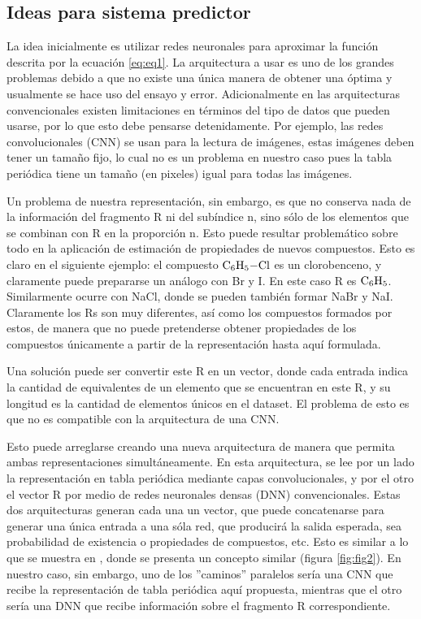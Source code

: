 \documentclass[twoside,twocolumn]{article}
\begin{document}
\subsection{Ideas para sistema predictor}
La idea inicialmente es utilizar redes neuronales para aproximar la funci\'on descrita por la ecuaci\'on \ref{eq:eq1}. La arquitectura a usar es uno de los grandes problemas debido a que no existe una \'unica manera de obtener una \'optima y usualmente se hace uso del ensayo y error. Adicionalmente en las arquitecturas convencionales existen limitaciones en t\'erminos del tipo de datos que pueden usarse, por lo que esto debe pensarse detenidamente. Por ejemplo, las redes convolucionales (CNN) se usan para la lectura de im\'agenes, estas im\'agenes deben tener un tama\~no fijo, lo cual no es un problema en nuestro caso pues la tabla peri\'odica tiene un tama\~no (en pixeles) igual para todas las im\'agenes.

Un problema de nuestra representaci\'on, sin embargo, es que no conserva nada de la informaci\'on del fragmento R ni del sub\'indice n, sino s\'olo de los elementos que se combinan con R en la proporci\'on n. Esto puede resultar problem\'atico sobre todo en la aplicaci\'on de estimaci\'on de propiedades de nuevos compuestos. Esto es claro en el siguiente ejemplo: el compuesto $\ce{C6H5-Cl}$ es un clorobenceno, y claramente puede prepararse un an\'alogo con Br y I. En este caso R es $\ce{C6H5}$. Similarmente ocurre con NaCl, donde se pueden tambi\'en formar NaBr y NaI. Claramente los Rs son muy diferentes, as\'i como los compuestos formados por estos, de manera que no puede pretenderse obtener propiedades de los compuestos \'unicamente a partir de la representaci\'on hasta aqu\'i formulada.

Una soluci\'on puede ser convertir este R en un vector, donde cada entrada indica la cantidad de equivalentes de un elemento que se encuentran en este R, y su longitud es la cantidad de elementos \'unicos en el dataset. El problema de esto es que no es compatible con la arquitectura de una CNN.

Esto puede arreglarse creando una nueva arquitectura de manera que permita ambas representaciones simult\'aneamente. En esta arquitectura, se lee por un lado la representaci\'on en tabla peri\'odica mediante capas convolucionales, y por el otro el vector R por medio de redes neuronales densas (DNN) convencionales. Estas dos arquitecturas generan cada una un vector, que puede concatenarse para generar una \'unica entrada a una s\'ola red, que producir\'a la salida esperada, sea probabilidad de existencia o propiedades de compuestos, etc. Esto es similar a lo que se muestra en \cite{parallelNN}, donde se presenta un concepto similar (figura \ref{fig:fig2}). En nuestro caso, sin embargo, uno de los ''caminos''  paralelos ser\'ia una CNN que recibe la representaci\'on de tabla peri\'odica aqu\'i propuesta, mientras que el otro ser\'ia una DNN que recibe informaci\'on sobre el fragmento R correspondiente.
\end{document}

